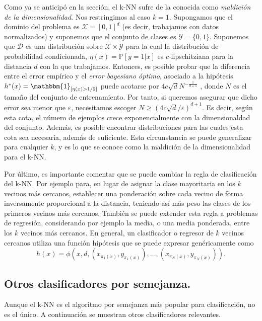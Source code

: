 Como ya se anticipó en la sección, el k-NN sufre de la conocida como \emph{maldición de la dimensionalidad}. Nos restringimos al caso $k=1$. Supongamos que el dominio del problema es $\mathcal{X} = [0,1]^d$ (es decir, trabajamos con datos normalizados) y suponemos que el conjunto de clases es $\mathcal{Y} = \{0,1\}$. Suponemos que $\mathcal{D}$ es una distribución sobre $\mathcal{X}\times\mathcal{Y}$ para la cual la distribución de probabilidad condicionada, $\eta(x) = \mathbb{P}[y=1|x]$ es $c$-lipschitziana para la distancia $d$ con la que trabajamos. Entonces, es posible probar que la diferencia entre el error empírico y el \emph{error bayesiano óptimo}, asociado a la hipótesis $h^*(x) = \mathbbm{1}_{[\eta(x) > 1/2]}$ puede acotarse por $4c \sqrt{d} N^{-\frac{1}{d+1}}$ \cite{understandingml}, donde $N$ es el tamaño del conjunto de entrenamiento. Por tanto, si queremos asegurar que dicho error sea menor que $\varepsilon$, necesitamos escoger $N \ge (4c\sqrt{d}/\varepsilon)^{d+1}$. Es decir, según esta cota, el número de ejemplos crece exponencialmente con la dimensionaldad del conjunto. Además, es posible encontrar distribuciones para las cuales esta cota sea necesaria, además de suficiente. Esta circunstancia se puede generalizar para cualquier $k$, y es lo que se conoce como la maldición de la dimensionalidad para el k-NN. 

Por último, es importante comentar que se puede cambiar la regla de clasificación del k-NN. Por ejemplo para, en lugar de asignar la clase mayoritaria en los $k$ vecinos más cercanos, establecer una ponderación sobre cada vecino de forma inversamente proporcional a la distancia, teniendo así más peso las clases de los primeros vecinos más cercanos. También se puede extender esta regla a problemas de regresión, considerando por ejemplo la media, o una media ponderada, entre los $k$ vecinos más cercanos. En general, un clasificador o regresor de $k$ vecinos cercanos utiliza una función hipótesis que se puede expresar genéricamente como
\[ h(x) = \phi(x,d,(x_{\pi_1(x)},y_{\pi_1(x)}),\dots,(x_{\pi_N(x)},y_{\pi_N(x)})). \]

\subsection{Otros clasificadores por semejanza.}

Aunque el k-NN es el algoritmo por semejanza más popular para clasificación, no es el único. A continuación se muestran otros clasificadores relevantes.

